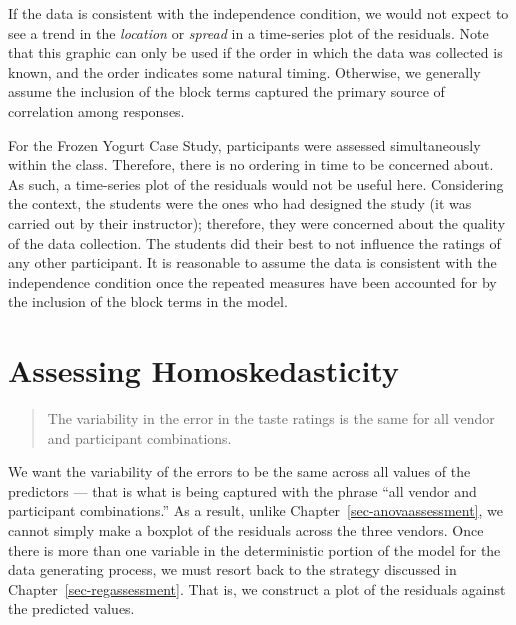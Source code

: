 \documentclass[
  letterpaper,
  DIV=11,
  numbers=noendperiod]{scrreprt}
\theoremstyle{definition}
\theoremstyle{definition}
\theoremstyle{plain}
\theoremstyle{remark}
\begin{document}
\begin{tcolorbox}[enhanced jigsaw, colbacktitle=quarto-callout-note-color!10!white, colback=white, left=2mm, title=\textcolor{quarto-callout-note-color}{\faInfo}\hspace{0.5em}{Graphically Assessing the Independence Condition}, toptitle=1mm, leftrule=.75mm, breakable, bottomrule=.15mm, arc=.35mm, rightrule=.15mm, toprule=.15mm, coltitle=black, opacityback=0, colframe=quarto-callout-note-color-frame, opacitybacktitle=0.6, bottomtitle=1mm, titlerule=0mm]

If the data is consistent with the independence condition, we would not
expect to see a trend in the \emph{location} or \emph{spread} in a
time-series plot of the residuals. Note that this graphic can only be
used if the order in which the data was collected is known, and the
order indicates some natural timing. Otherwise, we generally assume the
inclusion of the block terms captured the primary source of correlation
among responses.

\end{tcolorbox}

For the Frozen Yogurt Case Study, participants were assessed
simultaneously within the class. Therefore, there is no ordering in time
to be concerned about. As such, a time-series plot of the residuals
would not be useful here. Considering the context, the students were the
ones who had designed the study (it was carried out by their
instructor); therefore, they were concerned about the quality of the
data collection. The students did their best to not influence the
ratings of any other participant. It is reasonable to assume the data is
consistent with the independence condition once the repeated measures
have been accounted for by the inclusion of the block terms in the
model.

\section{Assessing Homoskedasticity}\label{assessing-homoskedasticity-2}

\begin{quote}
The variability in the error in the taste ratings is the same for all
vendor and participant combinations.
\end{quote}

We want the variability of the errors to be the same across all values
of the predictors --- that is what is being captured with the phrase
``all vendor and participant combinations.'' As a result, unlike
Chapter~\ref{sec-anovaassessment}, we cannot simply make a boxplot of
the residuals across the three vendors. Once there is more than one
variable in the deterministic portion of the model for the data
generating process, we must resort back to the strategy discussed in
Chapter~\ref{sec-regassessment}. That is, we construct a plot of the
residuals against the predicted values.
\end{document}

